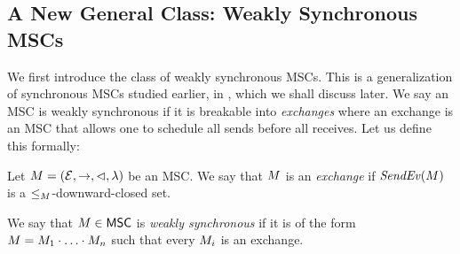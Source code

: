 \documentclass{article}
\begin{document}
\subsection{A New General Class: Weakly Synchronous MSCs} \label{sec:weakly-sync}

We first introduce the class of weakly synchronous MSCs. This is a generalization of synchronous MSCs studied earlier, in \cite{DBLP:conf/cav/BouajjaniEJQ18, DBLP:conf/fossacs/GiustoLL20}, which we shall discuss later. We say an MSC is weakly synchronous if it is breakable into \emph{exchanges} where an exchange is an MSC that allows one to schedule all sends before all receives. Let us define this formally:

\begin{definition}[exchange]\label{def:weak-synchr}
Let $M = (\mathcal{E},\to,\lhd,\lambda)$ be an MSC.
We say that $M$ is an \emph{exchange} if
$\mathit{SendEv}(M)$ is
a ${\le_M}$-downward-closed set.
\end{definition}

\begin{definition}\label{def:weaksync-new}
We say that $M \in \mathsf{MSC}$ is
\emph{weakly synchronous} if it is of the form
$M = M_1 \cdot \ldots \cdot M_n$
such that every $M_i$ is an exchange.
\end{definition}
\end{document}

